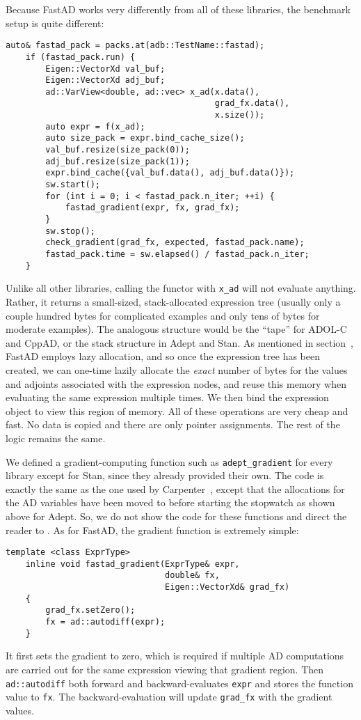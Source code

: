 Because FastAD works very differently from all of these libraries,
the benchmark setup is quite different:
\begin{lstlisting}[style=customcpp]
    auto& fastad_pack = packs.at(adb::TestName::fastad);
    if (fastad_pack.run) {
        Eigen::VectorXd val_buf;
        Eigen::VectorXd adj_buf;
        ad::VarView<double, ad::vec> x_ad(x.data(),
                                          grad_fx.data(),
                                          x.size());
        auto expr = f(x_ad);
        auto size_pack = expr.bind_cache_size();
        val_buf.resize(size_pack(0));
        adj_buf.resize(size_pack(1));
        expr.bind_cache({val_buf.data(), adj_buf.data()});
        sw.start();
        for (int i = 0; i < fastad_pack.n_iter; ++i) {
            fastad_gradient(expr, fx, grad_fx);
        }
        sw.stop();
        check_gradient(grad_fx, expected, fastad_pack.name);
        fastad_pack.time = sw.elapsed() / fastad_pack.n_iter;
    }
\end{lstlisting}
Unlike all other libraries, calling the functor with \verb|x_ad| will not evaluate anything.
Rather, it returns a small-sized, stack-allocated expression tree 
(usually only a couple hundred bytes for complicated examples and only tens of bytes for moderate examples).
The analogous structure would be the ``tape'' for ADOL-C and CppAD,
or the stack structure in Adept and Stan.
As mentioned in section~,
FastAD employs lazy allocation, and so once the expression tree has been created,
we can one-time lazily allocate the \emph{exact} number of bytes for the values and adjoints
associated with the expression nodes, and reuse this memory when evaluating the same expression multiple times.
We then bind the expression object to view this region of memory.
All of these operations are very cheap and fast.
No data is copied and there are only pointer assignments.
The rest of the logic remains the same.

We defined a gradient-computing function such as \verb|adept_gradient| for every library except for Stan,
since they already provided their own.
The code is exactly the same as the one used by Carpenter~\cite{carpenter:2015},
except that the allocations for the AD variables have been moved to before starting the stopwatch as shown above for Adept.
So, we do not show the code for these functions and 
direct the reader to .
As for FastAD, the gradient function is extremely simple:
\begin{lstlisting}[style=customcpp]
    template <class ExprType>
    inline void fastad_gradient(ExprType& expr,
                                double& fx,
                                Eigen::VectorXd& grad_fx) 
    {
        grad_fx.setZero();
        fx = ad::autodiff(expr);
    }
\end{lstlisting}
It first sets the gradient to zero, which is required if multiple AD computations 
are carried out for the same expression viewing that gradient region.
Then \verb|ad::autodiff| both forward and backward-evaluates \verb|expr|
and stores the function value to \verb|fx|.
The backward-evaluation will update \verb|grad_fx| with the gradient values.

